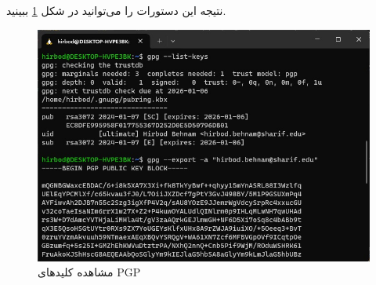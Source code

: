 \documentclass[]{article}
\begin{document}
نتیجه این دستورات را می‌توانید در شکل
\ref{fig:gpg:view}
ببینید.
\begin{figure}[H]
    \centering
    \includegraphics[scale=0.5]{pics/gpg-view.jpg}
    \caption{مشاهده کلید‌های PGP}
    \label{fig:gpg:view}
\end{figure}
\end{document}
